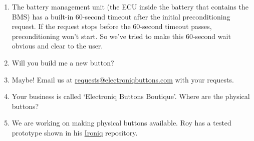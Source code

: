 \documentclass[superscriptaddress,onecolumn,floatfix]{revtex4-2}
\begin{document}
\begin{enumerate}
  \item[A:] The battery management unit (the ECU inside the battery that contains the BMS) has a built-in 60-second timeout after the initial preconditioning request. If the request stops before the 60-second timeout passes, preconditioning won't start. So we've tried to make this 60-second wait obvious and clear to the user.
  \item[Q:] Will you build me a new button?
  \item[A:] Maybe! Email us at \href{mailto:requests@electroniqbuttons.com}{requests@electroniqbuttons.com} with your requests.
  \item[Q:] Your business is called `Electroniq Buttons Boutique'. Where are the physical buttons?
  \item[A:] We are working on making physical buttons available. Roy has a tested prototype shown in his \href{https://github.com/dragz/ironiq}{Ironiq} repository.
\end{enumerate}
\appendix 
\end{document}
